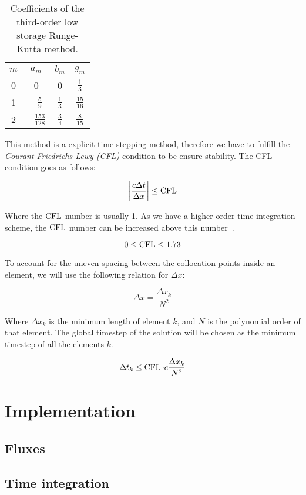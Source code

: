 \begin{table}[H]
	\centering
	\begin{tabular}{c c c c}
		$m$ & $a_m$ & $b_m$ & $g_m$ \\
		\hline
		0 & 0 & 0 & $\frac{1}{3}$ \\
		1 & $-\frac{5}{9}$ & $\frac{1}{3}$ & $\frac{15}{16}$ \\
		2 & $-\frac{153}{128}$ & $\frac{3}{4}$ & $\frac{8}{15}$ \\
	\end{tabular}
	\caption{Coefficients of the third-order low storage Runge-Kutta method.}
	\label{table:runge_kutta_coefficient}
\end{table}

This method is a explicit time stepping method, therefore we have to fulfill the \textit{Courant
Friedrichs Lewy (CFL)} condition to be ensure stability. The CFL condition goes as follows:

\begin{equation}
	\left| \frac{c \Delta t}{\Delta x} \right| \leq \operatorname{CFL}
\end{equation}

Where the $\operatorname{CFL}$ number is usually 1. As we have a higher-order time integration scheme, the $\operatorname{CFL}$
number can be increased above this number~\cite{Gottlieb2001}.

\begin{equation}
        0 \leq \operatorname{CFL} \leq 1.73 
\end{equation}

To account for the uneven spacing between the collocation points inside an element, we will use the
following relation for $\Delta x$: 

\begin{equation}
    \Delta x = \frac{\Delta x_{k}}{N^2}
\end{equation}

Where $\Delta x_{k}$ is the minimum length of element $k$, and $N$ is the polynomial order of that
element. The global timestep of the solution will be chosen as the minimum timestep of all the
elements $k$. 

\begin{equation}
    \Delta t_k \leq \operatorname{CFL} \cdot c \frac{\Delta x_{k}}{N^2}
\end{equation}

\section{Implementation} \label{section:spectral_element_method:implementation}

\subsection{Fluxes} \label{section:spectral_element_method:implementation:fluxes}

\subsection{Time integration} \label{section:spectral_element_method:implementation:time}
